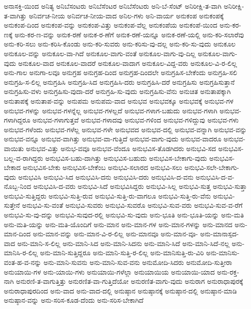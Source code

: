 {ಅನಾಸಕ್ತಿ-ಯಿಂದ
ಅನಿತ್ಯ
ಅನಿಬೆಸಂಟರು
ಅನಿಬೆಸೆಂಟರ
ಅನಿಬೆಸೆಂಟರು
ಅನಿ-ಬೆ-ಸೆಂಟ್
ಅನಿರೀಕ್ಷಿ-ತ-ವಾಗಿ
ಅನಿರೀಕ್ಷಿ-ತ-ವಾಗಿತ್ತು
ಅನಿರ್ವಚ-ನೀಯ
ಅನಿರ್ವಚ-ನೀಯ-ವಾದ
ಅನಿಲ-ಗಳು
ಅನಿ-ವಾರ್ಯ
ಅನುಕಂಪ
ಅನುಕಂಪಕ್ಕೆ
ಅನುಕಂಪ-ದಿಂದ
ಅನುಕಂಪ-ವನ್ನು
ಅನುಕಂಪ-ವಿತ್ತು
ಅನುಕಂಪ-ವೆಲ್ಲ
ಅನುಕಂಪೆಯ
ಅನುಕಂಪೆ-ಯಿಂದ
ಅನು-ಕರ-ಣಕ್ಕೆ
ಅನು-ಕರ-ಣ-ವನ್ನು
ಅನುಕ-ರಣೆ
ಅನುಕ-ರ-ಣೆಗೆ
ಅನುಕ-ರಣೆ-ಯನ್ನೂ
ಅನುಕ-ರಣೆ-ಯಲ್ಲಿ
ಅನು-ಕರಿ-ಸಲಾರೆವು
ಅನು-ಕರಿ-ಸಲು
ಅನು-ಕರಿಸಿ-ಕೊಂಡು
ಅನು-ಕರಿ-ಸುವರು
ಅನು-ಕರಿಸು-ವು-ದಲ್ಲ
ಅನು-ಕರಿ-ಸು-ವುದು
ಅನುಕೂಲ
ಅನುಕೂಲ-ವನ್ನು
ಅನುಕೂಲ-ವಾ-ಗಿದೆ
ಅನುಕೂಲ-ವಾಗು-ವಂತೆ
ಅನುಕೂಲ-ವಾಗು-ವು-ದಿಲ್ಲ
ಅನುಕೂಲ-ವಾಗು-ವುದು
ಅನುಕೂಲ-ವಾದ
ಅನುಕೂಲ-ವಾದರೆ
ಅನುಕೂಲ-ವಾದಾಗ
ಅನುಕೂಲ-ವಿದ್ದ-ವರು
ಅನುಕೂಲ-ವಿ-ರ-ಲಿಲ್ಲ
ಅನು-ಗಾಲ
ಅನುಗಾ-ಲವೂ
ಅನುಗ್ರಹ
ಅನುಗ್ರಹ-ದಿಂದ
ಅನುಗ್ರಹ-ದಿಂದಲೇ
ಅನುಗ್ರಹಿಸ-ಬೇಕೆಂದು
ಅನುಗ್ರಹಿ-ಸಲಿ
ಅನುಗ್ರಹಿ-ಸ-ಲಿಲ್ಲ
ಅನುಗ್ರಹಿಸಿ
ಅನುಗ್ರಹಿ-ಸಿದ
ಅನುಗ್ರಹಿಸಿ-ದರು
ಅನುಗ್ರಹಿಸಿ-ದರೆ
ಅನುಗ್ರಹಿಸು
ಅನುಗ್ರಹಿಸುತ್ತಾನೆ
ಅನುಗ್ರಹಿಸು-ವಳು
ಅನುಗ್ರಹಿಸು-ವುದಾ-ದರೆ
ಅನುಗ್ರಹಿ-ಸು-ವುದು
ಅನುಗ್ರಹಿಸು-ವೆನು
ಅನುಚಿತ
ಅನುತಾಪಕ್ಕಾಗಿ
ಅನುತಾಪಕ್ಕೆ
ಅನುತಾಪ-ವನ್ನು
ಅನುಪಮ
ಅನುಪಮ-ವಾದ
ಅನುಭವ
ಅನುಭವಕ್ಕೂ
ಅನುಭವಕ್ಕೆ
ಅನುಭವ-ಗಳ
ಅನುಭವ-ಗಳನ್ನು
ಅನುಭವ-ಗಳನ್ನೆಲ್ಲ
ಅನುಭವ-ಗಳಲ್ಲದೆ
ಅನುಭವ-ಗಳಾಗ-ಬಹುದು
ಅನುಭವ-ಗಳಾಗಿ
ಅನುಭವ-ಗಳಾಗಿದ್ದರೂ
ಅನುಭವ-ಗಳಾಗುತ್ತವೆ
ಅನುಭವ-ಗಳಾದವು
ಅನುಭವ-ಗಳಿಂದ
ಅನುಭವ-ಗಳಿದ್ದುವು
ಅನುಭವ-ಗಳು
ಅನುಭವ-ಗಳೆಂದು
ಅನುಭವ-ಗಳೆಲ್ಲ
ಅನುಭವ-ಗಳೇ
ಅನುಭವದ
ಅನುಭವ-ದಲ್ಲಿ
ಅನುಭವ-ವನ್ನಾಗಿ
ಅನುಭವ-ವನ್ನು
ಅನುಭವ-ವನ್ನೂ
ಅನುಭವ-ವಾಗಿತ್ತು
ಅನುಭವ-ವಾ-ಗುತ್ತಿದೆ
ಅನುಭವ-ವಾಗು-ವುದು
ಅನುಭವ-ವಾದರೂ
ಅನುಭವ-ವಾಯಿತು
ಅನುಭವ-ವಿತ್ತು
ಅನುಭ-ವವೂ
ಅನುಭವ-ವೆಂದೂ
ಅನುಭವಿಸ-ತೊಡಗಿದರು
ಅನುಭವಿ-ಸದ
ಅನುಭವಿಸ-ಬಲ್ಲ-ವ-ರಾಗಿದ್ದರು
ಅನುಭವಿಸ-ಬಹು-ದಾಗಿತ್ತು
ಅನುಭವಿಸ-ಬಹುದು
ಅನುಭವಿಸ-ಬೇಕಾಗು-ವುದು
ಅನುಭವಿಸ-ಬೇಕಾದ
ಅನುಭವಿಸ-ಬೇಕು
ಅನುಭವಿಸ-ಬೇಕೆಂಬ
ಅನುಭವಿ-ಸಲಾರದ
ಅನುಭವಿ-ಸಲು
ಅನುಭವಿ-ಸಲೇ-ಬೇಕಾಗು-ವುದು
ಅನುಭವಿಸಿ
ಅನುಭವಿ-ಸಿದ
ಅನುಭವಿಸಿ-ದನು
ಅನುಭವಿಸಿ-ದರು
ಅನುಭವಿಸಿ-ದ-ವನು
ಅನುಭವಿಸಿ-ದ-ವ-ನೊಬ್ಬ-ನಿಂದ
ಅನುಭವಿಸಿ-ದ-ವರು
ಅನುಭವಿ-ಸಿದೆ
ಅನುಭವಿಸಿದ್ದರು
ಅನುಭವಿ-ಸಿಲ್ಲ
ಅನುಭವಿ-ಸುತ್ತ
ಅನುಭವಿ-ಸುತ್ತಾ
ಅನುಭವಿ-ಸುತ್ತಿದ್ದರು
ಅನುಭವಿ-ಸುತ್ತಿ-ರುವ
ಅನುಭವಿ-ಸುತ್ತಿ-ರು-ವಾಗಲೂ
ಅನುಭವಿ-ಸುತ್ತಿ-ರು-ವೆನು
ಅನುಭವಿ-ಸುತ್ತೇನೆ
ಅನುಭವಿ-ಸು-ವಂತೆ
ಅನುಭವಿ-ಸುವರು
ಅನುಭವಿ-ಸುವರೊ
ಅನುಭವಿ-ಸುವ-ವರು
ಅನುಭವಿ-ಸುವ-ವ-ರೆಗೆ
ಅನುಭವಿ-ಸು-ವು-ದನ್ನು
ಅನುಭವಿ-ಸುವುದ-ರಲ್ಲಿ
ಅನುಭವಿ-ಸು-ವುದು
ಅನು-ಭೂತಿ
ಅನು-ಭೂತಿ-ಯನ್ನು
ಅನು-ಮತಿ
ಅನು-ಮತಿ-ಯನ್ನು
ಅನು-ಮತಿ-ಯೊಂದಿಗೆ
ಅನು-ಮಾನ
ಅನು-ಮಾನ-ಗಳ
ಅನು-ಮಾನ-ಗಳನ್ನು
ಅನು-ಮಾನದ
ಅನು-ಮಾನ-ದಿಂದ
ಅನು-ಮಾನ-ವನ್ನು
ಅನು-ಮಾನ-ವಿ-ರ-ಲಿಲ್ಲ
ಅನು-ಮಾನವೂ
ಅನು-ಮಾನ-ವೂ-
ಅನು-ಮಾನಾಸ್ಪದ-ವಾದ
ಅನು-ಮಾನಿ-ಸ-ಲಿಲ್ಲ
ಅನು-ಮಾನಿ-ಸಿದ
ಅನು-ಮಾನಿ-ಸಿದನು
ಅನು-ಮಾನಿ-ಸಿದೆ
ಅನು-ಮಾನಿ-ಸಿದೆ-ನಲ್ಲ
ಅನು-ಮಾನಿಸಿ-ರ-ಲಿಲ್ಲ
ಅನು-ಮಾನಿ-ಸುತ್ತಿದ್ದರೂ
ಅನು-ಮಾನಿ-ಸುತ್ತಿ-ರ-ಲಿಲ್ಲ
ಅನು-ಮಾನಿಸುತ್ತಿ-ರು-ವಿರಿ
ಅನು-ಮಾನಿಸು-ವಂತ-ಹ-ವ-ನನ್ನು
ಅನು-ಮಾನಿ-ಸುವನು
ಅನು-ಮಾನಿ-ಸುವ-ವನು
ಅನುಮೋದಿ-ಸಿದರು
ಅನುಮೋದಿ-ಸುತ್ತೀರಾ
ಅನುಯಾಯಿ-ಗಳ
ಅನು-ಯಾಯಿ-ಗಳು
ಅನುಯಾಯಿ-ಗಳೆಲ್ಲಾ
ಅನುಯಾಯಿಯ
ಅನುಯಾಯಿ-ಯಾದ
ಅನು-ರಕ್ತ-ನಾಗಿ
ಅನುರಣಿ-ತ-ವಾಗುತ್ತಿತ್ತು
ಅನುರಣಿತ-ವಾ-ಗುತ್ತಿದೆಯೋ
ಅನುರಣಿತ-ವಾಗು-ವುದು
ಅನುರಾಗ
ಅನುರಾಧಾಪುರಕ್ಕೆ
ಅನುರಾಧಾಪುರದಿಂದ
ಅನು-ವಾದ
ಅನು-ವಾದ-ದಲ್ಲಿ
ಅನುಷ್ಠಾನ
ಅನುಷ್ಠಾನಕ್ಕೆ
ಅನುಷ್ಠಾನ-ದಲ್ಲಿ
ಅನುಷ್ಠಾನ-ಮಾಡಿ
ಅನುಷ್ಠಾನ-ವನ್ನು
ಅನು-ಸರಿಸ-ಕೂಡ-ದೆಂದು
ಅನು-ಸರಿಸ-ಬೇಕಾಗಿದೆ
}
